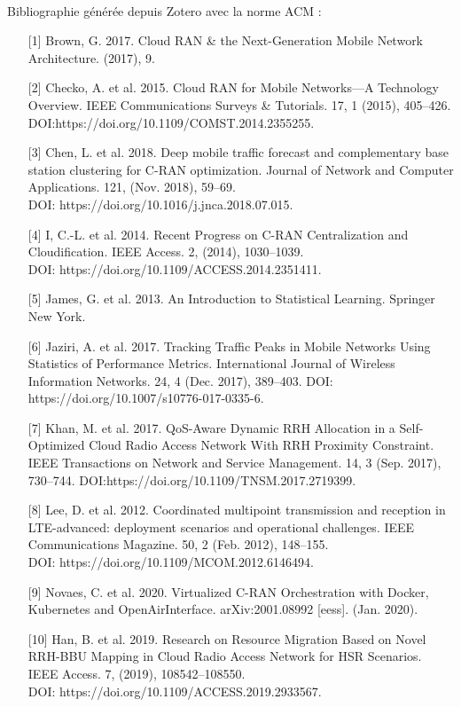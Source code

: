 \documentclass{article}
\begin{document}
\paragraph{}Bibliographie générée depuis Zotero avec la norme ACM : \\
\begin{enumerate}
\item[{[1]}] Brown, G. 2017. Cloud RAN & the Next-Generation Mobile Network Architecture. (2017), 9.
\item[{[2]}] Checko, A. et al. 2015. Cloud RAN for Mobile Networks—A Technology Overview. IEEE Communications Surveys & Tutorials. 17, 1 (2015), 405–426. DOI:https://doi.org/10.1109/COMST.2014.2355255.
\item[{[3]}] Chen, L. et al. 2018. Deep mobile traffic forecast and complementary base station clustering for C-RAN optimization. Journal of Network and Computer Applications. 121, (Nov. 2018), 59–69.\\
DOI: https://doi.org/10.1016/j.jnca.2018.07.015.
\item[{[4]}] I, C.-L. et al. 2014. Recent Progress on C-RAN Centralization and Cloudification. IEEE Access. 2, (2014), 1030–1039.\\DOI: https://doi.org/10.1109/ACCESS.2014.2351411.
\item[{[5]}] James, G. et al. 2013. An Introduction to Statistical Learning. Springer New York.
\item[{[6]}] Jaziri, A. et al. 2017. Tracking Traffic Peaks in Mobile Networks Using Statistics of Performance Metrics. International Journal of Wireless Information Networks. 24, 4 (Dec. 2017), 389–403. DOI: https://doi.org/10.1007/s10776-017-0335-6.
\item[{[7]}] Khan, M. et al. 2017. QoS-Aware Dynamic RRH Allocation in a Self-Optimized Cloud Radio Access Network With RRH Proximity Constraint. IEEE Transactions on Network and Service Management. 14, 3 (Sep. 2017), 730–744. DOI:https://doi.org/10.1109/TNSM.2017.2719399.
\item[{[8]}] Lee, D. et al. 2012. Coordinated multipoint transmission and reception in LTE-advanced: deployment scenarios and operational challenges. IEEE Communications Magazine. 50, 2 (Feb. 2012), 148–155.\\DOI: https://doi.org/10.1109/MCOM.2012.6146494.
\item[{[9]}] Novaes, C. et al. 2020. Virtualized C-RAN Orchestration with Docker, Kubernetes and OpenAirInterface. arXiv:2001.08992 [eess]. (Jan. 2020).
\item[{[10]}] Han, B. et al. 2019. Research on Resource Migration Based on Novel RRH-BBU Mapping in Cloud Radio Access Network for HSR Scenarios. IEEE Access. 7, (2019), 108542–108550.\\DOI: https://doi.org/10.1109/ACCESS.2019.2933567.

\end{enumerate}
\end{document}
